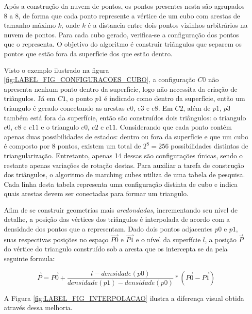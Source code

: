 Após a construção da nuvem de pontos, os pontos presentes nesta são agrupados 8 a 8, de forma que cada ponto represente a vértice de um cubo com arestas de tamanho máximo $k$, onde $k$ é a distancia entre dois pontos vizinhos arbitrários na nuvem de pontos. Para cada cubo gerado, verifica-se a configuração dos pontos que o representa. O objetivo do algoritmo é construir triângulos que separem os pontos que estão fora da superfície dos que estão dentro.

Visto o exemplo ilustrado na figura \ref{fig:LABEL_FIG_CONFIGURACOES_CUBO}, a configuração $C0$ não apresenta nenhum ponto dentro da superfície, logo não necessita da criação de triângulos. Já em $C1$, o ponto $p1$ é indicado como dentro da superfície, então um triangulo é gerado conectando as arestas $e0$, $e3$ e $e8$. Em $C2$, além de $p1$, $p3$ também está fora da superfície, então são construídos dois triângulos: o triangulo $e0$, $e8$ e $e11$ e o triangulo $e0$, $e2$ e $e11$. Considerando que cada ponto contém apenas duas possibilidades de estados: dentro ou fora da superfície e que um cubo é composto por 8 pontos, existem um total de $2^8 = 256$ possibilidades distintas de triangularização. Entretanto, apenas 14 dessas são configurações únicas, sendo o restante apenas variações de rotação destas. Para auxiliar a tarefa de construção dos triângulos, o algoritmo de marching cubes utiliza de uma tabela de pesquisa. Cada linha desta tabela representa uma configuração distinta de cubo e indica quais arestas devem ser conectadas para formar um triangulo.

Afim de se construir geometrias mais \textit{aredondadas}, incrementando seu nível de detalhe, a posição das vértices dos triângulos é interpolada de acordo com a densidade dos pontos que a representam. Dado dois pontos adjacentes $p0$ e $p1$, suas respectivas posições no espaço $\overrightarrow{P0}$ e $\overrightarrow{P1}$ e o nível da superfície $l$, a posição $\overrightarrow{P}$ do vértice do triangulo construído sob a aresta que os intercepta se da pela seguinte formula:


\begin{equation}
    \overrightarrow{P} = \overrightarrow{P0} + \frac{l - densidade(p0)}{densidade(p1) - densidade(p0)} * (\overrightarrow{P0} - \overrightarrow{P1})
\end{equation}

A Figura \ref{fig:LABEL_FIG_INTERPOLACAO} ilustra a diferença visual obtida através dessa melhoria.

